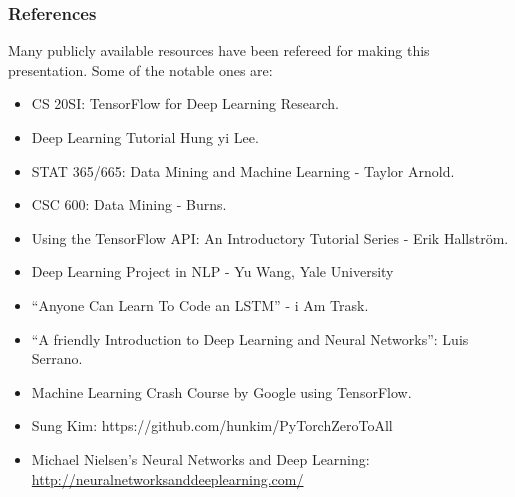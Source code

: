 %
%
%
%



\begin{frame}\frametitle{References}

Many publicly available resources have been refereed for making this presentation. Some of the notable ones are:
\tiny
\begin{itemize}
\item CS 20SI: TensorFlow for Deep Learning Research.
\item Deep Learning Tutorial Hung yi Lee.
\item STAT 365/665: Data Mining and Machine Learning - Taylor Arnold.
\item CSC 600: Data Mining - Burns.
\item Using the TensorFlow API: An Introductory Tutorial Series - Erik Hallström.
\item Deep Learning Project in NLP - Yu Wang, Yale University
\item ``Anyone Can Learn To Code an LSTM'' - i Am Trask.
\item ``A friendly Introduction to Deep Learning and Neural Networks'': Luis Serrano.
\item Machine Learning Crash Course by Google using TensorFlow.
\item Sung Kim: https://github.com/hunkim/PyTorchZeroToAll
\item Michael Nielsen's Neural Networks and Deep Learning: \url{http://neuralnetworksanddeeplearning.com/}
\end{itemize}


\end{frame}

%
%
%
%
